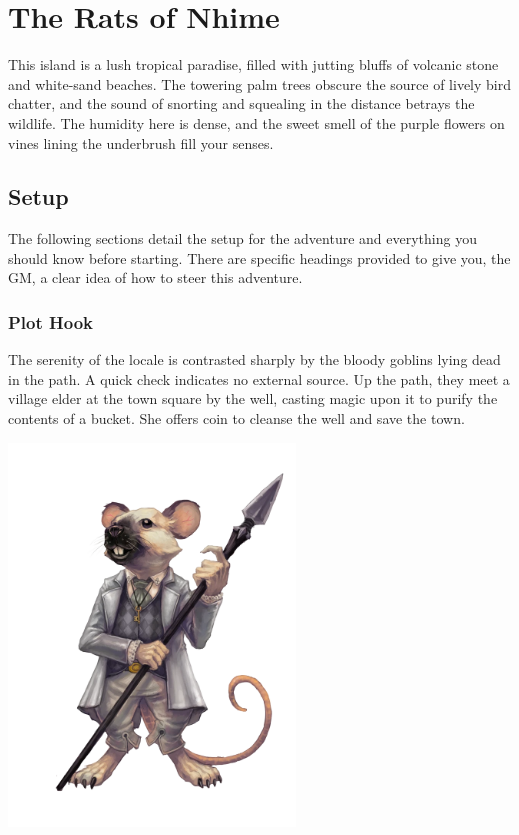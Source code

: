\pfMakeSplashHeader[
  image = oneshot,
  title = The Rats of Nhime,
  headerHeight = -7cm,
  textBodyHeight = 6cm
]

\chapter{The Rats of Nhime}

This island is a lush tropical paradise, filled with jutting bluffs of volcanic stone and white-sand beaches. The towering palm trees obscure the source of lively bird chatter, and the sound of snorting and squealing in the distance betrays the wildlife. The humidity here is dense, and the sweet smell of the purple flowers on vines lining the underbrush fill your senses.

\begin{multicols}{2}

  \section{Setup}
  The following sections detail the setup for the adventure and everything you should know before starting. There are specific headings provided to give you, the GM, a clear idea of how to steer this adventure.

  \subsection{Plot Hook}
  The serenity of the locale is contrasted sharply by the bloody goblins lying dead in the path. A quick check indicates no external source. Up the path, they meet a village elder at the town square by the well, casting magic upon it to purify the contents of a bucket. She offers coin to cleanse the well and save the town.

  \begin{minipage}[t]{.15\textwidth}
    \includegraphics[width=3in]{book/img/Swarm_Voice}
  \end{minipage}


\end{multicols}
